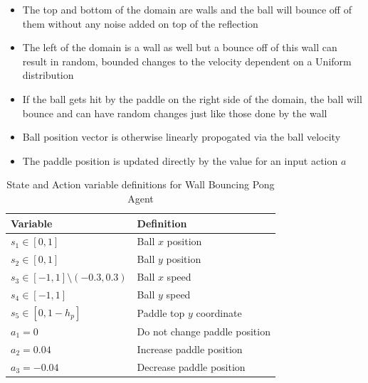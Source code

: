 \documentclass{article}[12pt]
\begin{document}
   \begin{itemize} 
   	\item The top and bottom of the domain are walls and the ball will bounce off of them without any noise added on top of the reflection
   	\item The left of the domain is a wall as well but a bounce off of this wall can result in random, bounded changes to the velocity dependent on a Uniform distribution
   	\item If the ball gets hit by the paddle on the right side of the domain, the ball will bounce and can have random changes just like those done by the wall
   	\item Ball position vector is otherwise linearly propogated via the ball velocity
   	\item The paddle position is updated directly by the value for an input action $a$
   \end{itemize}
   
    \begin{table}[ht]
   	\centering
   	\begin{tabular}{l | l}
   		\hline
   		Variable & Definition  \\
   		\hline \hline 
   		$s_1 \in [0,1]$ & Ball $x$ position\\
   		$s_2 \in [0,1]$ & Ball $y$ position\\
   		$s_3 \in [-1,1]\setminus (-0.3,0.3)$ & Ball $x$ speed \\
   		$s_4 \in [-1,1]$ & Ball $y$ speed \\
   		$s_5 \in [0, 1-h_p]$ & Paddle top $y$ coordinate\\
   		$a_1 = 0$ & Do not change paddle position\\
   		$a_2 = 0.04$ & Increase paddle position\\
   		$a_3 = -0.04 $ & Decrease paddle position \\
   		\hline
   	\end{tabular}
   	\caption{State and Action variable definitions for Wall Bouncing Pong Agent} \label{tab:vwall}
   \end{table}
\end{document}
